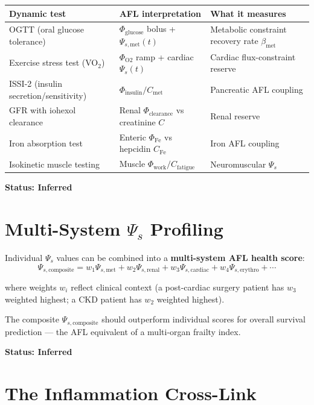 \documentclass[12pt,a4paper]{article}
\begin{document}
\begin{center}
\begin{tabular}{lll}
\toprule
Dynamic test & AFL interpretation & What it measures \\
\midrule
OGTT (oral glucose tolerance) & $\Phi_{\mathrm{glucose}}$ bolus + $\Psi_{s,\mathrm{met}}(t)$ & Metabolic constraint recovery rate $\beta_{\mathrm{met}}$ \\
Exercise stress test (VO$_2$) & $\Phi_{\mathrm{O2}}$ ramp + cardiac $\Psi_s(t)$ & Cardiac flux-constraint reserve \\
ISSI-2 (insulin secretion/sensitivity) & $\Phi_{\mathrm{insulin}} / C_{\mathrm{met}}$ & Pancreatic AFL coupling \\
GFR with iohexol clearance & Renal $\Phi_{\mathrm{clearance}}$ vs creatinine $C$ & Renal reserve \\
Iron absorption test & Enteric $\Phi_{\mathrm{Fe}}$ vs hepcidin $C_{\mathrm{Fe}}$ & Iron AFL coupling \\
Isokinetic muscle testing & Muscle $\Phi_{\mathrm{work}} / C_{\mathrm{fatigue}}$ & Neuromuscular $\Psi_s$ \\
\bottomrule
\end{tabular}
\end{center}

\textbf{Status: Inferred}

\section{Multi-System $\Psi_s$ Profiling}

Individual $\Psi_s$ values can be combined into a \textbf{multi-system AFL health score}:
\begin{equation}
    \Psi_{s,\mathrm{composite}} = w_1 \Psi_{s,\mathrm{met}} + w_2 \Psi_{s,\mathrm{renal}} + w_3 \Psi_{s,\mathrm{cardiac}} + w_4 \Psi_{s,\mathrm{erythro}} + \cdots
\end{equation}

where weights $w_i$ reflect clinical context (a post-cardiac surgery patient has $w_3$ weighted highest; a CKD patient has $w_2$ weighted highest).

The composite $\Psi_{s,\mathrm{composite}}$ should outperform individual scores for overall survival prediction --- the AFL equivalent of a multi-organ frailty index.

\textbf{Status: Inferred}

\section{The Inflammation Cross-Link}
\end{document}
